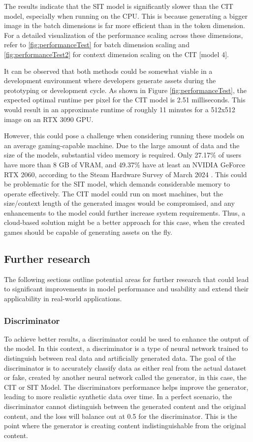     The results indicate that the SIT model is significantly slower than the CIT model, especially when running on the CPU. This is because generating a bigger image in the batch dimensions is far more efficient than in the token dimension. For a detailed visualization of the performance scaling across these dimensions, refer to \autoref{fig:performanceTest} for batch dimension scaling and \autoref{fig:performanceTest2} for context dimension scaling on the CIT [model 4].

    It can be observed that both methods could be somewhat viable in a development environment where developers generate assets during the prototyping or development cycle. As shown in Figure \autoref{fig:performanceTest}, the expected optimal runtime per pixel for the CIT model is 2.51 milliseconds. This would result in an approximate runtime of roughly 11 minutes for a 512x512 image on an RTX 3090 GPU.
    
    However, this could pose a challenge when considering running these models on an average gaming-capable machine. Due to the large amount of data and the size of the models, substantial video memory is required. Only 27.17\% of users have more than 8 GB of VRAM, and 49.37\% have at least an NVIDIA GeForce RTX 2060, according to the Steam Hardware Survey of March 2024 \autocite{Valve2024}. This could be problematic for the SIT model, which demands considerable memory to operate effectively. The CIT model could run on most machines, but the size/context length of the generated images would be compromised, and any enhancements to the model could further increase system requirements. Thus, a cloud-based solution might be a better approach for this case, when the created games should be capable of generating assets on the fly.
    

\subsection{Further research}

    The following sections outline potential areas for further research that could lead to significant improvements in model performance and usability and extend their applicability in real-world applications.

    \subsubsection{Discriminator}
    To achieve better results, a discriminator could be used to enhance the output of the model. In this context, a discriminator is a type of neural network trained to distinguish between real data and artificially generated data. The goal of the discriminator is to accurately classify data as either real from the actual dataset or fake, created by another neural network called the generator, in this case, the CIT or SIT Model. The discriminators performance helps improve the generator, leading to more realistic synthetic data over time. In a perfect scenario, the discriminator cannot distinguish between the generated content and the original content, and the loss will balance out at 0.5 for the discriminator. This is the point where the generator is creating content indistinguishable from the original content.

